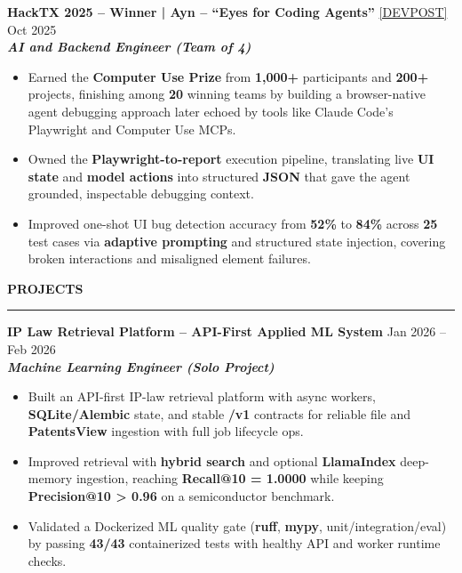 \documentclass[10pt, letterpaper]{article}
\newenvironment{highlights}{
    \begin{itemize}[
        topsep=0.10 cm,
        parsep=0.10 cm,
        partopsep=0pt,
        itemsep=0pt,
        leftmargin=0 cm + 10pt
    ]
}{
    \end{itemize}
} %
\begin{document}
    \textbf{HackTX 2025 -- Winner | Ayn -- ``Eyes for Coding Agents''} \href{https://devpost.com/software/orion-7jafvu}{[DEVPOST]} \hfill Oct 2025 \\
    \textit{\textbf{AI and Backend Engineer (Team of 4)}} \\
    \begin{highlights}
        \item Earned the \textbf{Computer Use Prize} from \textbf{1,000+} participants and \textbf{200+} projects, finishing among \textbf{20} winning teams by building a browser-native agent debugging approach later echoed by tools like Claude Code's Playwright and Computer Use MCPs.
        \item Owned the \textbf{Playwright-to-report} execution pipeline, translating live \textbf{UI state} and \textbf{model actions} into structured \textbf{JSON} that gave the agent grounded, inspectable debugging context.
        \item Improved one-shot UI bug detection accuracy from \textbf{52\%} to \textbf{84\%} across \textbf{25} test cases via \textbf{adaptive prompting} and structured state injection, covering broken interactions and misaligned element failures.
    \end{highlights}
    \vspace{3pt}

    {\bfseries PROJECTS} \\
    \vspace{2pt}
    \hrule
    \vspace{2pt}
    \textbf{IP Law Retrieval Platform -- API-First Applied ML System} \hfill Jan 2026 -- Feb 2026 \\
    \textit{\textbf{Machine Learning Engineer (Solo Project)}} \\
    \begin{highlights}
        \item Built an API-first IP-law retrieval platform with async workers, \textbf{SQLite/Alembic} state, and stable \textbf{/v1} contracts for reliable file and \textbf{PatentsView} ingestion with full job lifecycle ops.
        \item Improved retrieval with \textbf{hybrid search} and optional \textbf{LlamaIndex} deep-memory ingestion, reaching \textbf{Recall@10 = 1.0000} while keeping \textbf{Precision@10 > 0.96} on a semiconductor benchmark.
        \item Validated a Dockerized ML quality gate (\textbf{ruff}, \textbf{mypy}, unit/integration/eval) by passing \textbf{43/43} containerized tests with healthy API and worker runtime checks.
    \end{highlights}
    \vspace{0pt}
\end{document}
